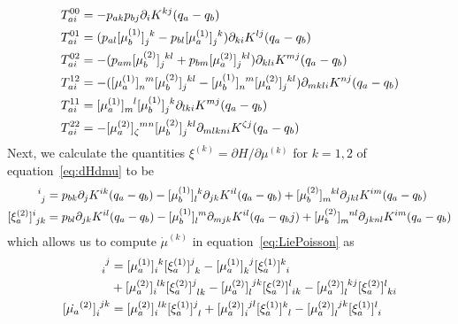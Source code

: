 \documentclass[12pt]{amsart}
\begin{document}
\begin{align*}
  T^{00}_{a i} &= -p_{a k} p_{b j} \partial_{i} K^{k j}(q_a - q_b) \\
  T^{01}_{a i} &= (p_{a l}[\mu_b^{(1)}]\indices{_j^k}
                  -p_{b l}[\mu_a^{(1)}]\indices{_j^k}) \partial_{k i} K^{l j}(q_a - q_b) \\
  T^{02}_{a i} &= -(p_{a m}[\mu_b^{(2)}]\indices{_j^{k l}}
                   +p_{b m}[\mu_a^{(2)}] \indices{_j^{k l}}) \partial_{k l i}K^{m j}(q_a - q_b) \\
  T^{12}_{a i} &= -([\mu_a^{(1)}]\indices{_n^m} [\mu_b^{(2)}]\indices{_j^{k l}}
                   -[\mu_b^{(1)}]\indices{_n^m} [\mu_a^{(2)}]\indices{_j^{k l}})
                   \partial_{m k l i}K^{n j}(q_a - q_b) \\
  T^{11}_{a i} &= [\mu_a^{(1)}] \indices{_m^l} [\mu_b^{(1)}]\indices{_j^k}
                  \partial_{l k i} K^{m j}(q_a - q_b) \\
  T^{22}_{a i} &=-[\mu_a^{(2)}]\indices{_\zeta^{m n}} [\mu_b^{(2)}]\indices{_j^{k l}}
                  \partial_{m l k n i} K^{\zeta j}(q_a - q_b)
\end{align*}
Next, we calculate the quantities $\xi^{(k)} = \partial H / \partial \mu^{(k)}$
for $k=1,2$ of equation~\eqref{eq:dHdmu} to be
\begin{align*}
  [\xi_a^{(1)} ]\indices{^i_j} &=
  p_{b k} \partial_j K^{i k}(q_a - q_b)
 -[\mu_b^{(1)}]\indices{_{l}^{k}} \partial_{j k} K^{i l}(q_a - q_b)
 +[\mu_b^{(2)}]\indices{_{m}^{k l} }\partial_{j k l} K^{i m}(q_a - q_b) \\
  [\xi_a^{(2)}]\indices{^i_{j k}} &= p_{b l} \partial_{j k} K^{i l}(q_a - q_b)
 -[\mu_b^{(1)}]\indices{_l^m} \partial_{m j k} K^{i l}(q_a - q_bj)
 +[\mu_b^{(2)}]\indices{_m^{n l}}\partial_{j k n l}K^{i m}(q_a-q_b)
\end{align*}
which allows us to compute $\dot{\mu}^{(k)}$ in equation~\eqref{eq:LiePoisson} as
\begin{align*}
  [\dot{\mu}^{(1)}_a ]\indices{_i^j} &=
  [\mu_a^{(1)}]\indices{_i^k} [\xi_a^{(1)}]\indices{^j_k}
 -[\mu_a^{(1)}]\indices{_k^j} [\xi_a^{(1)}]\indices{^k_i} \\
&+[\mu_a^{(2)}]\indices{_i^{l k}} [\xi_a^{(2)}]\indices{^j_{l k}}
 -[\mu_a^{(2)}]\indices{_l^{j k}} [\xi_a^{(2)}]\indices{^l_{i k}}
 -[\mu_a^{(2)}]\indices{_l^{k j}} [\xi_a^{(2)}]\indices{^l_{k i}} \\
  [\dot{\mu_a}^{(2)}]\indices{_i^{j k}} &=
  [\mu_a^{(2)}]\indices{_i^{l k}} [\xi_a^{(1)}]\indices{^j_l}
 +[\mu_a^{(2)}]\indices{_i^{j l}} [\xi_a^{(1)}]\indices{^k_l}
 -[\mu_a^{(2)}]\indices{_l^{j k}} [\xi_a^{(1)}]\indices{^l_i}
\end{align*}
\end{document}
